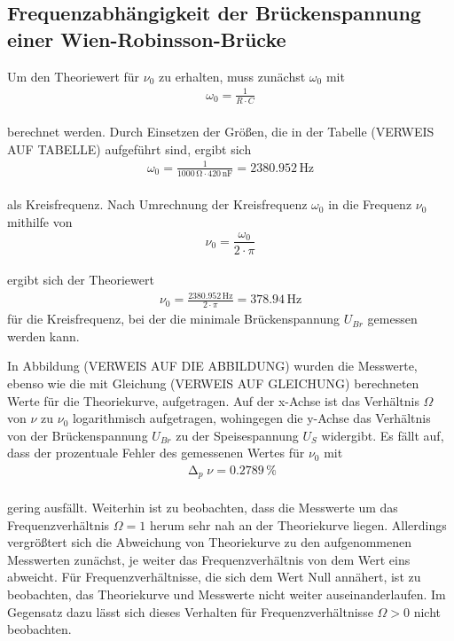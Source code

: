 \subsection{Frequenzabhängigkeit der Brückenspannung einer Wien-Robinsson-Brücke}

Um den Theoriewert für $\nu_{0}$ zu erhalten, muss zunächst $\omega_{0}$ mit 
\begin{align}
\omega_{0} = \frac{1}{R \cdot C} \nonumber
\end{align}
\\ 
berechnet werden. Durch Einsetzen der Größen, die in der Tabelle (VERWEIS AUF TABELLE) 
aufgeführt sind, ergibt sich
\begin{align}
\omega_{0} = \frac{1}{1000\, \si{\ohm} \cdot 420\, \si{\nano\farad}} = 2380.952\, \si{\hertz} \nonumber
\end{align}
\\ 
als Kreisfrequenz. Nach Umrechnung der Kreisfrequenz $\omega_{0}$ in die Frequenz $\nu_{0}$ mithilfe von 
\begin{equation}
\nu_{0} = \frac{\omega_{0}}{2 \cdot \pi} \nonumber
\end{equation}
\\
ergibt sich der Theoriewert 
\begin{align}
\nu_{0} = \frac{2380.952\, \si{\hertz}}{2 \cdot \pi} = 378.94\, \si{\hertz} \nonumber
\end{align}
für die Kreisfrequenz, bei der die minimale Brückenspannung $U_{Br}$ gemessen werden kann.

In Abbildung (VERWEIS AUF DIE ABBILDUNG) wurden die Messwerte, ebenso wie die mit Gleichung (VERWEIS AUF GLEICHUNG) 
berechneten Werte für die Theoriekurve, aufgetragen. Auf der x-Achse ist das Verhältnis $\Omega$ von $\nu$ zu $\nu_{0}$
logarithmisch aufgetragen, wohingegen die y-Achse das Verhältnis von der Brückenspannung $U_{Br}$ zu der Speisespannung
$U_{S}$ widergibt.
Es fällt auf, dass der prozentuale Fehler des gemessenen Wertes für $\nu_{0}$ mit 
\begin{align}
\upDelta_{p} \nu = 0.2789\, \% \nonumber
\end{align}
\\
gering ausfällt. Weiterhin ist zu beobachten, dass die Messwerte um das Frequenzverhältnis $\Omega = 1$
herum sehr nah an der Theoriekurve liegen. Allerdings vergrößtert sich die Abweichung von Theoriekurve zu den aufgenommenen
Messwerten zunächst, je weiter das Frequenzverhältnis von dem Wert eins abweicht. Für Frequenzverhältnisse, die sich dem Wert Null
annähert, ist zu beobachten, das Theoriekurve und Messwerte nicht weiter auseinanderlaufen. Im Gegensatz dazu lässt sich 
dieses Verhalten für Frequenzverhältnisse $\Omega > 0$ nicht beobachten.


